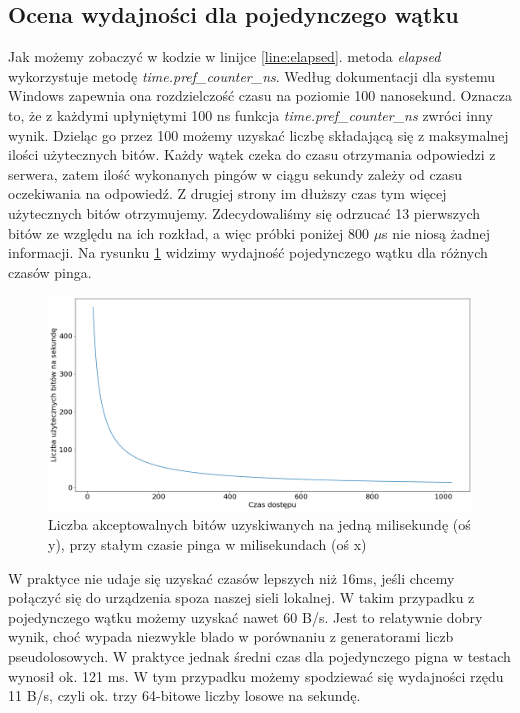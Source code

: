 \subsection{Ocena wydajności dla pojedynczego wątku}
\sloppy Jak możemy zobaczyć w kodzie w linijce \ref{line:elapsed}. metoda \emph{elapsed} wykorzystuje metodę \emph{time.pref\_counter\_ns}. Według dokumentacji \cite{PythonTimeDoc} dla systemu Windows zapewnia ona rozdzielczość czasu na poziomie 100 nanosekund. Oznacza to, że z każdymi upłyniętymi 100 ns funkcja \emph{time.pref\_counter\_ns} zwróci inny wynik. Dzieląc go przez 100 możemy uzyskać liczbę składającą się z maksymalnej ilości użytecznych bitów. Każdy wątek czeka do czasu otrzymania odpowiedzi z serwera, zatem ilość wykonanych pingów w ciągu sekundy zależy od czasu oczekiwania na odpowiedź. Z drugiej strony im dłuższy czas tym więcej użytecznych bitów otrzymujemy. Zdecydowaliśmy się odrzucać 13 pierwszych bitów ze względu na ich rozkład, a więc próbki poniżej 800 $\mu$s nie niosą żadnej informacji. Na rysunku \ref{fig:generated_bits_in_time} widzimy wydajność pojedynczego wątku dla różnych czasów pinga.
\begin{figure}[!htp]
    \centering
    \includegraphics[width=15cm]{generated_bits_in_time}
    \caption{Liczba akceptowalnych bitów uzyskiwanych na jedną milisekundę (oś y), przy stałym czasie pinga w milisekundach (oś x) }
    \label{fig:generated_bits_in_time}
\end{figure}
W praktyce nie udaje się uzyskać czasów lepszych niż 16ms, jeśli chcemy połączyć się do urządzenia spoza naszej sieli lokalnej. W takim przypadku z pojedynczego wątku możemy uzyskać nawet 60 B/s. Jest to relatywnie dobry wynik, choć wypada niezwykle blado w porównaniu z generatorami liczb pseudolosowych. W praktyce jednak średni czas dla pojedynczego pigna w testach wynosił ok. 121 ms. W tym przypadku możemy spodziewać się wydajności rzędu 11 B/s, czyli ok. trzy 64-bitowe liczby losowe na sekundę.  
